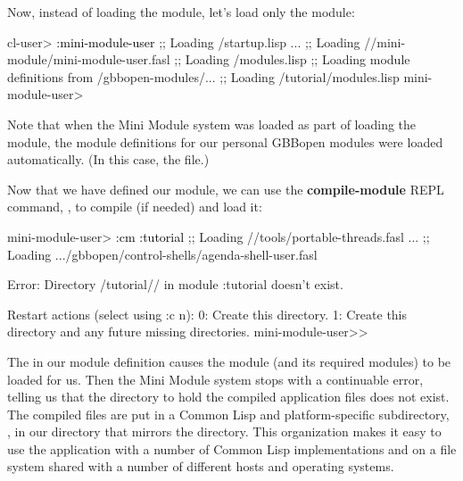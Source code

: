\documentclass[10pt,twoside,english,pdftex]{article}
\begin{document}
Now, instead of loading the  module, let's load only
the  module:
%
\W\supp
\begin{example}
\textcolor{darkergray}{%
  cl-user> \textcolor{black}{:mini-module-user}
  ;; Loading /startup.lisp
     ...
  ;;     Loading //mini-module/mini-module-user.fasl
  ;;   Loading /modules.lisp
  ;; Loading module definitions from /gbbopen-modules/...
  ;;     Loading /tutorial/modules.lisp
  mini-module-user>}
\end{example}
%
Note that when the Mini Module system was loaded as part of loading the
 module, the module definitions for our personal
GBBopen modules were loaded automatically.  (In this case, the
 file.)  

Now that we have defined our  module, we can use the
\textbf{compile-module} REPL command, , to compile (if needed) and
load it:
%
\W\supp
\begin{example}
\textcolor{darkergray}{%
  mini-module-user> \textcolor{black}{:cm :tutorial}
  ;;   Loading //tools/portable-threads.fasl
     ...
  ;;   Loading .../gbbopen/control-shells/agenda-shell-user.fasl

  Error: Directory /tutorial// 
         in module :tutorial doesn't exist.

  Restart actions (select using :c n):
    0: Create this directory.
    1: Create this directory and any future missing directories.
  mini-module-user>>}
\end{example}
%
The  in our  module definition causes the
 module (and its required modules) to be loaded for
us.  Then the Mini Module system stops with a continuable error, telling us
that the directory to hold the compiled application files does not exist.  The
compiled files are put in a Common Lisp and platform-specific subdirectory,
, in our  directory that mirrors
the  directory.  This organization makes it easy to use the
application with a number of Common Lisp implementations and on a file system
shared with a number of different hosts and operating systems.
\end{document}
